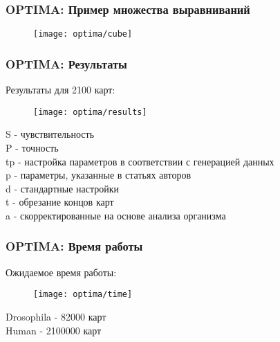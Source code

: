 \begin{frame}
\frametitle{OPTIMA: Пример множества выравниваний}
\begin{figure}
  \centering
  \texttt{[image: optima/cube]}
\end{figure}
\end{frame}



\begin{frame}
\frametitle{OPTIMA: Результаты}
Результаты для 2100 карт:
\begin{figure}
  \centering
  \texttt{[image: optima/results]}
\end{figure}
S - чувствительность \\
P - точность \\
tp - настройка параметров в соответствии с генерацией данных \\
p - параметры, указанные в статьях авторов \\
d - стандартные настройки \\
t - обрезание концов карт \\
a - скорректированные на основе анализа организма
\end{frame}

\begin{frame}
\frametitle{OPTIMA: Время работы}
Ожидаемое время работы:
\begin{figure}
  \centering
  \texttt{[image: optima/time]}
\end{figure}
Drosophila - 82000 карт \\
Human - 2100000 карт
\end{frame}
